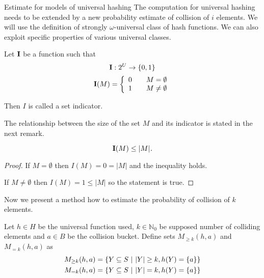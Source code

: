 \begin{section}{Estimate for models of universal hashing}
The computation for universal hashing needs to be extended by a new probability estimate of collision of $i$ elements. We will use the definition of strongly $\omega$-universal class of hash functions. We can also exploit specific properties of various universal classes.

\begin{definition}
Let $\mathbf{I}$ be a function such that
\begin{displaymath}
\mathbf{I}: 2^U \rightarrow \lbrace 0, 1 \rbrace
\end{displaymath}
\begin{displaymath}
\mathbf{I}(M) = \left\{ 
\begin{array}{l l}
  0 & \quad M = \emptyset \\
  1 & \quad M \neq \emptyset \\
\end{array} \right.
\end{displaymath}

Then $I$ is called a set indicator.
\end{definition}

The relationship between the size of the set $M$ and its indicator is stated in the next remark.
\begin{remark}
\[\mathbf{I}(M) \leq |M| \textit{.} \]
\end{remark}
\begin{proof}
If $M = \emptyset$ then $I(M) = 0 = |M|$ and the inequality holds. 

If $M \neq \emptyset$ then $I(M) = 1 \leq |M|$ so the statement is true.
\end{proof}

Now we present a method how to estimate the probability of collision of $k$ elements.
\begin{definition}
Let $h \in H$ be the universal function used, $k \in \mathbb{N}_0$ be supposed number of colliding elements and $a \in B$ be the collision bucket. Define sets $M_{\geq k}(h, a)$ and $M_{= k}(h, a)$ as
\begin{displaymath}
\begin{split}
M_{\geq k}(h, a) & = \{Y \subseteq S \ | \  |Y| \geq k, h(Y) = \{a\}\} \\
M_{= k}(h, a) & = \{Y \subseteq S \ | \  |Y| = k, h(Y) = \{a\}\} 
\end{split}
\end{displaymath}
\end{definition}


\end{section}
